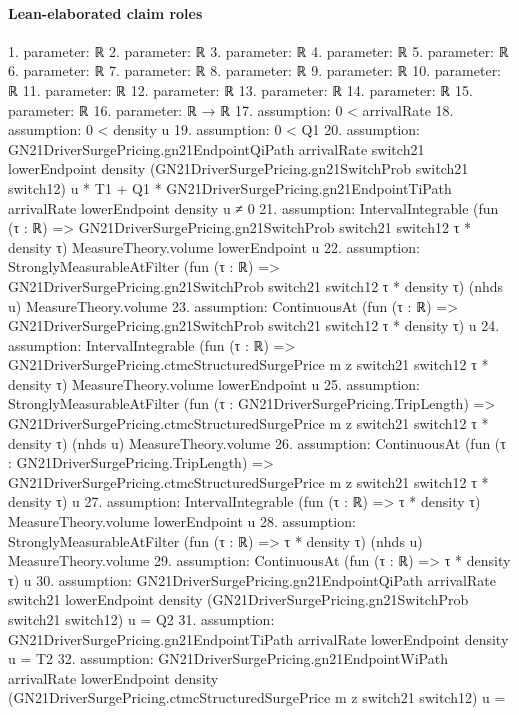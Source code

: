 \documentclass[10pt]{article}
\begin{document}
\paragraph{Lean-elaborated claim roles}\begin{ReviewVerbatim}
1. parameter: ℝ
2. parameter: ℝ
3. parameter: ℝ
4. parameter: ℝ
5. parameter: ℝ
6. parameter: ℝ
7. parameter: ℝ
8. parameter: ℝ
9. parameter: ℝ
10. parameter: ℝ
11. parameter: ℝ
12. parameter: ℝ
13. parameter: ℝ
14. parameter: ℝ
15. parameter: ℝ
16. parameter: ℝ → ℝ
17. assumption: 0 < arrivalRate
18. assumption: 0 < density u
19. assumption: 0 < Q1
20. assumption: GN21DriverSurgePricing.gn21EndpointQiPath arrivalRate switch21 lowerEndpoint density
        (GN21DriverSurgePricing.gn21SwitchProb switch21 switch12) u *
      T1 +
    Q1 * GN21DriverSurgePricing.gn21EndpointTiPath arrivalRate lowerEndpoint density u ≠
  0
21. assumption: IntervalIntegrable (fun (τ : ℝ) => GN21DriverSurgePricing.gn21SwitchProb switch21 switch12 τ * density τ)
  MeasureTheory.volume lowerEndpoint u
22. assumption: StronglyMeasurableAtFilter (fun (τ : ℝ) => GN21DriverSurgePricing.gn21SwitchProb switch21 switch12 τ * density τ)
  (nhds u) MeasureTheory.volume
23. assumption: ContinuousAt (fun (τ : ℝ) => GN21DriverSurgePricing.gn21SwitchProb switch21 switch12 τ * density τ) u
24. assumption: IntervalIntegrable (fun (τ : ℝ) => GN21DriverSurgePricing.ctmcStructuredSurgePrice m z switch21 switch12 τ * density τ)
  MeasureTheory.volume lowerEndpoint u
25. assumption: StronglyMeasurableAtFilter
  (fun (τ : GN21DriverSurgePricing.TripLength) =>
    GN21DriverSurgePricing.ctmcStructuredSurgePrice m z switch21 switch12 τ * density τ)
  (nhds u) MeasureTheory.volume
26. assumption: ContinuousAt
  (fun (τ : GN21DriverSurgePricing.TripLength) =>
    GN21DriverSurgePricing.ctmcStructuredSurgePrice m z switch21 switch12 τ * density τ)
  u
27. assumption: IntervalIntegrable (fun (τ : ℝ) => τ * density τ) MeasureTheory.volume lowerEndpoint u
28. assumption: StronglyMeasurableAtFilter (fun (τ : ℝ) => τ * density τ) (nhds u) MeasureTheory.volume
29. assumption: ContinuousAt (fun (τ : ℝ) => τ * density τ) u
30. assumption: GN21DriverSurgePricing.gn21EndpointQiPath arrivalRate switch21 lowerEndpoint density
    (GN21DriverSurgePricing.gn21SwitchProb switch21 switch12) u =
  Q2
31. assumption: GN21DriverSurgePricing.gn21EndpointTiPath arrivalRate lowerEndpoint density u = T2
32. assumption: GN21DriverSurgePricing.gn21EndpointWiPath arrivalRate lowerEndpoint density
    (GN21DriverSurgePricing.ctmcStructuredSurgePrice m z switch21 switch12) u =

\end{ReviewVerbatim}
\end{document}
